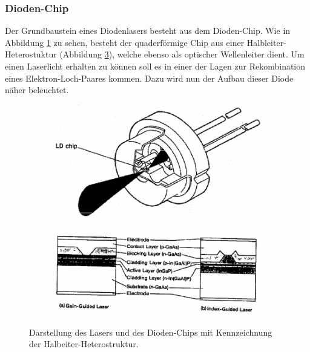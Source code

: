 \subsubsection{Dioden-Chip}
Der Grundbaustein eines Diodenlasers besteht aus dem Dioden-Chip. Wie in
Abbildung \ref{fig:chip} zu sehen, besteht der quaderförmige Chip aus einer
Halbleiter-Heterostuktur (Abbildung \ref{fig:struktur}), welche ebenso als
optischer Wellenleiter dient. Um
einen Laserlicht erhalten zu können soll es in einer der Lagen zur Rekombination
eines Elektron-Loch-Paares kommen. Dazu wird nun der Aufbau dieser Diode näher
beleuchtet.
\begin{figure}
  \begin{subfigure}[c]{0.5\textwidth}
    \centering
    \includegraphics[width=\textwidth]{images/Diodenl.pdf}
    \label{fig:chip}
  \end{subfigure}
  \begin{subfigure}[c]{0.5\textwidth}
    \includegraphics[width=\textwidth, angle=1, origin=c]{images/schema.pdf}
    \label{fig:struktur}
  \end{subfigure}
  \caption{Darstellung des Lasers und des Dioden-Chips mit Kennzeichnung der
  Halbeiter-Heterostruktur\cite{anleitung}.}
\end{figure}
